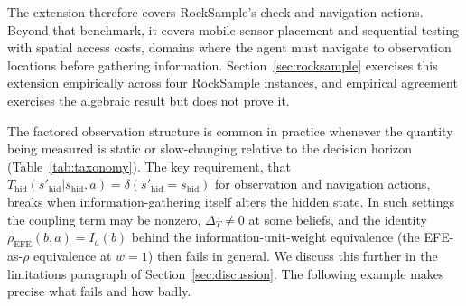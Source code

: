 The extension therefore covers RockSample's check and navigation actions. Beyond that benchmark, it covers mobile sensor placement and sequential testing with spatial access costs, domains where the agent must navigate to observation locations before gathering information. Section~\ref{sec:rocksample} exercises this extension empirically across four RockSample instances, and empirical agreement exercises the algebraic result but does not prove it.

The factored observation structure is common in practice whenever the quantity being measured is static or slow-changing relative to the decision horizon (Table~\ref{tab:taxonomy}). The key requirement, that $T_{\mathrm{hid}}(s'_{\mathrm{hid}} | s_{\mathrm{hid}}, a) = \delta(s'_{\mathrm{hid}} = s_{\mathrm{hid}})$ for observation and navigation actions, breaks when information-gathering itself alters the hidden state. In such settings the coupling term may be nonzero, $\Delta_T \neq 0$ at some beliefs, and the identity $\rho_{\mathrm{EFE}}(b,a) = I_a(b)$ behind the information-unit-weight equivalence (the EFE-as-$\rho$ equivalence at $w{=}1$) then fails in general. We discuss this further in the limitations paragraph of Section~\ref{sec:discussion}. The following example makes precise what fails and how badly.


